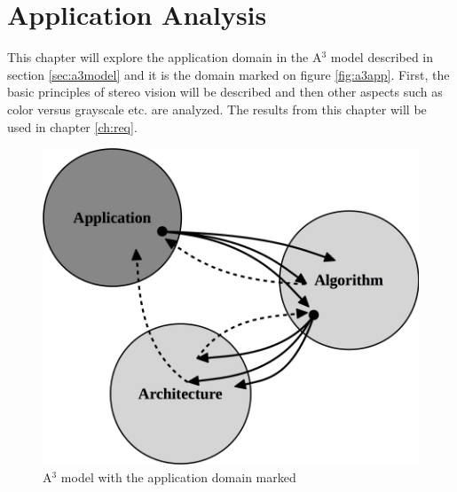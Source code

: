 \chapter{Application Analysis} \label{ch:appanalysis}
This chapter will explore the application domain in the A$^3$ model described in section \vref{sec:a3model} and it is the domain marked on figure \vref{fig:a3app}. First, the basic principles of stereo vision will be described and then other aspects such as color versus grayscale etc. are analyzed. The results from this chapter will be used in chapter \vref{ch:req}.

\begin{figure}[ht!]
  \centering
  \includegraphics[scale=0.25]{figures/a3app}
  \caption{A$^3$ model with the application domain marked}
  \label{fig:a3app}
\end{figure}

